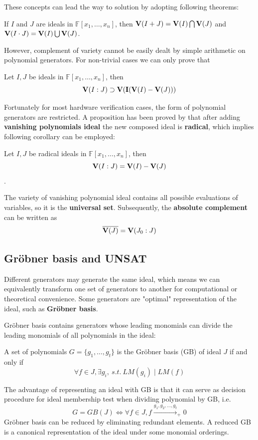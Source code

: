 These concepts can lead the way to solution by adopting following theorems:
\begin{Theorem}
\label{thm:unionintersect}
If $I$ and $J$ are ideals in $\mathbb F[x_1, \dots, x_n]$, then ${\bf V}(I + J) = {\bf V}(I)
\bigcap {\bf V}(J)$ and ${\bf V}(I \cdot J) = {\bf V}(I) \bigcup {\bf V}(J)$.
\end{Theorem}
However, complement of variety cannot be easily dealt by simple arithmetic on polynomial generators.
For non-trivial cases we can only prove that 
\begin{Theorem}
Let $I, J$ be ideals in $\mathbb F[x_1,\dots,x_n]$, then 
$${\bf V}(I:J) \supset {\bf V}({\bf I}({\bf V}(I) - {\bf V}(J)))$$
\end{Theorem}

Fortunately for most hardware verification cases, the form of polynomial generators are restricted.
A proposition has been proved by \cite{jinpeng} that after adding {\bf vanishing polynomials ideal}
the new composed ideal is {\bf radical}, which implies following corollary can be employed:
\begin{Corollary}
\label{thm:quotient}
Let $I, J$ be radical ideals in $\mathbb F[x_1,\dots,x_n]$, then 
$${\bf V}(I:J) = {\bf V}(I) - {\bf V}(J)$$.
\end{Corollary}
The variety of vanishing polynomial ideal contains all possible evaluations of variables, so it
is the {\bf universal set}. Subsequently, the {\bf absolute complement} can be written as
$$\overline{{\bf V}(J)} = {\bf V}(J_0:J)$$

\subsection{Gr\"obner basis and UNSAT}
Different generators may generate the same ideal, which means we can equivalently transform one set of generators
to another for computational or theoretical convenience.
Some generators are "optimal" representation of the ideal, such as {\bf Gr\"obner basis}.

Gr\"obner basis contains generators whose leading monomials can divide the leading monomials of all polynomials 
in the ideal:
\begin{Definition}
A set of polynomials $G = \{g_1,\dots,g_t\}$ is the Gr\"obner basis (GB) of ideal $J$ if and only if
$$\forall f\in J, \exists g_i,\ s.t.\ LM(g_i)\mid LM(f)$$
\end{Definition}
The advantage of representing an ideal with GB is that it can serve as decision procedure for ideal membership
test when dividing polynomial by GB, i.e.
$$G = GB(J) \Longleftrightarrow \forall f\in J, f\xrightarrow{g_1,g_2,\dots,g_t}_{+} 0$$
Gr\"obner basis can be reduced by eliminating redundant elements. A reduced GB is a canonical representation of 
the ideal under some monomial orderings.

